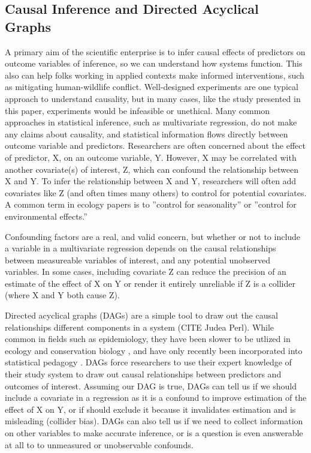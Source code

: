 \documentclass[12pt,]{article}
\begin{document}
\subsection{Causal Inference and Directed Acyclical Graphs}
A primary aim of the scientific enterprise is to infer causal effects of predictors on outcome variables of inference, so we can understand how systems function. This also can help folks working in applied contexts make informed interventions, such as mitigating human-wildlife conflict. Well-designed experiments are one typical approach to understand causality, but in many cases, like the study presented in this paper, experiments would be infeasible or unethical. Many common approaches in statistical inference, such as multivariate regression, do not make any claims about causality, and statistical information flows directly between outcome variable and predictors. Researchers are often concerned about the effect of predictor, X, on an outcome variable, Y.  However, X may be correlated with another covariate(s) of interest, Z, which can confound the relationship between X and Y. To infer the relationship between X and Y, researchers will often add covariates like Z (and often times many others) to control for potential covariates. A common term in ecology papers is to ''control for seasonality'' or ''control for environmental effects.''

Confounding factors are a real, and valid concern, but whether or not to include a variable in a multivariate regression depends on the causal relationships between measureable variables of interest, and any potential unobserved variables. In some cases, including  covariate Z can reduce the precision of an estimate of the effect of X on Y or render it entirely unreliable if Z is a collider (where X and Y both cause Z).

Directed acyclical graphs (DAGs) are a simple tool to draw out the causal relationships different components in a system (CITE Judea Perl). While common in fields such as epidemiology, they have been slower to be utlized in ecology and conservation biology \citep{Laubach_etal_CI_2021}, and have only recently been incorporated into statistical pedagogy \citep{McElreath2020}. DAGs force researchers to use their expert knowledge of their study system to draw out causal relationships between predictors and outcomes of interest. Assuming our DAG is true, DAGs can tell us if we should include a covariate in a regression as it is a confound to improve estimation of the effect of X on Y, or if should exclude it because it invalidates estimation and is misleading (collider bias). DAGs can also tell us if we need to collect information on other variables to make accurate inference, or is a question is even answerable at all to to unmeasured or unobservable confounds.
\end{document}
